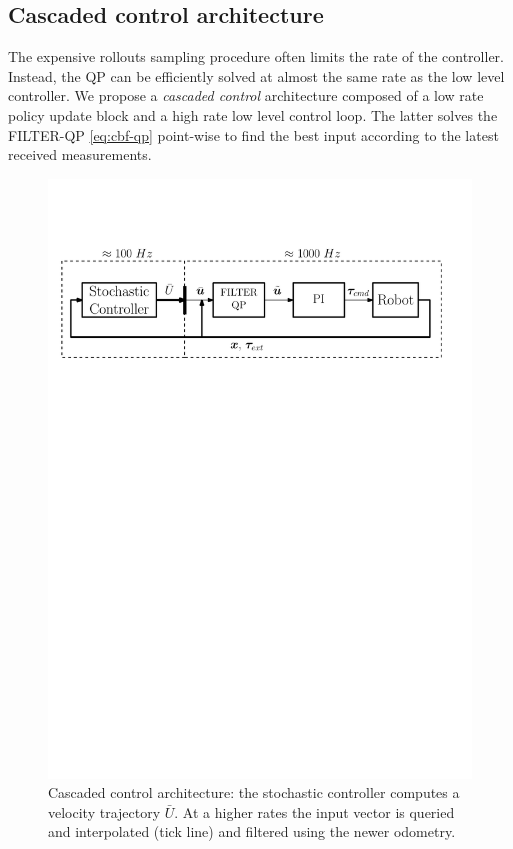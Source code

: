 \subsection{Cascaded control architecture}
The expensive rollouts sampling procedure often limits the rate of the controller. Instead, the QP can be efficiently solved at almost the same rate as the low level controller. We propose a \emph{cascaded control} architecture composed of a low rate policy update block and a high rate low level control loop. The latter solves the FILTER-QP \ref{eq:cbf-qp} point-wise to find the best input according to the latest received measurements. 
\begin{figure}[t!]
\centering
\hspace*{-0.7cm}
\includegraphics[width=1.1\columnwidth]{figures/schemes/high_level_architecture.pdf}
\caption{Cascaded control architecture: the stochastic controller computes a velocity trajectory $\bar{U}$. At a higher rates the input vector is queried and interpolated (tick line) and filtered using the newer odometry.} \label{fig:cascaded_architecture}
\end{figure}

